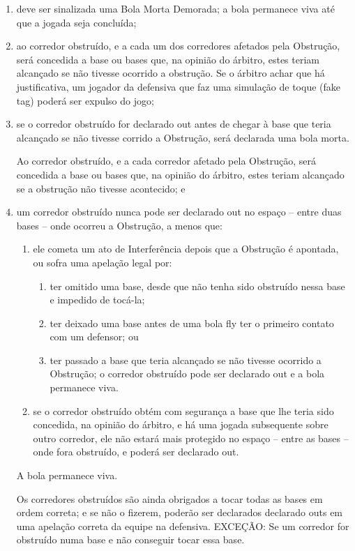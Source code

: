 \begin{enumerate}[label=(\alph*)]\item   deve ser sinalizada uma Bola Morta Demorada; a bola permanece viva até que a jogada seja concluída;
	\item  ao corredor obstruído, e a cada um dos corredores afetados pela Obstrução, será concedida a base ou bases que, na opinião do árbitro, estes teriam alcançado se não tivesse ocorrido a obstrução. Se o árbitro achar que há justificativa, um jogador da defensiva que faz uma simulação de toque (\gls{fake tag}) poderá ser expulso do jogo;

	\item  se o corredor obstruído for declarado \gls{out} antes de chegar à base que teria alcançado se não tivesse corrido a Obstrução, será declarada uma bola morta.

	Ao corredor obstruído, e a cada corredor afetado pela Obstrução, será concedida a base ou bases que, na opinião do árbitro, estes teriam alcançado se a obstrução não tivesse acontecido; e
	\item  um corredor obstruído nunca pode ser declarado \gls{out} no espaço -- entre duas bases -- onde ocorreu a Obstrução, a menos que:

\begin{enumerate}[label=\roman*.]
	\item ele cometa um ato de Interferência depois que a Obstrução é apontada, ou sofra uma apelação legal por:

	 \begin{enumerate}[label=\arabic*)]
	 	\item ter omitido uma base, desde que não tenha sido obstruído nessa base e impedido de tocá-la;
	 	\item ter deixado uma base antes de uma bola \gls{fly} ter o primeiro contato com um defensor; ou
		\item ter passado a base que teria alcançado se não tivesse ocorrido a  Obstrução; o corredor obstruído pode ser declarado \gls{out} e a bola permanece viva.
	\end{enumerate}
	\item se o corredor obstruído obtém com segurança a base que lhe teria sido concedida, na opinião do árbitro, e há uma jogada subsequente sobre outro corredor, ele não estará mais protegido no espaço -- entre as bases -- onde fora  obstruído, e poderá ser declarado \gls{out}.
 \end{enumerate}

 A bola permanece viva.

 Os corredores  obstruídos são ainda obrigados a tocar todas as bases em ordem correta; e se  não o fizerem, poderão ser declarados declarado \gls{out}s em uma apelação correta da equipe na defensiva. EXCEÇÃO: Se um corredor for obstruído numa base e não conseguir tocar essa base.

\end{enumerate}

